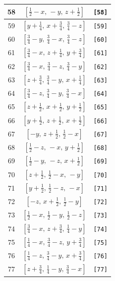 \documentclass[fleqn,8pt]{jsarticle}
\begin{document}
\begin{longtable}{ccc}
58 & $\left[ \frac{1}{2} - x,\, - y,\, z + \frac{1}{2} \right]$ & {\tt [58]} \\ \hline
59 & $\left[ y + \frac{1}{4},\, x + \frac{3}{4},\, \frac{3}{4} - z \right]$ & {\tt [59]} \\ \hline
60 & $\left[ \frac{3}{4} - y,\, \frac{3}{4} - x,\, \frac{3}{4} - z \right]$ & {\tt [60]} \\ \hline
61 & $\left[ \frac{3}{4} - x,\, z + \frac{1}{4},\, y + \frac{3}{4} \right]$ & {\tt [61]} \\ \hline
62 & $\left[ \frac{3}{4} - x,\, \frac{3}{4} - z,\, \frac{3}{4} - y \right]$ & {\tt [62]} \\ \hline
63 & $\left[ z + \frac{3}{4},\, \frac{3}{4} - y,\, x + \frac{1}{4} \right]$ & {\tt [63]} \\ \hline
64 & $\left[ \frac{3}{4} - z,\, \frac{3}{4} - y,\, \frac{3}{4} - x \right]$ & {\tt [64]} \\ \hline
65 & $\left[ z + \frac{1}{2},\, x + \frac{1}{2},\, y + \frac{1}{2} \right]$ & {\tt [65]} \\ \hline
66 & $\left[ y + \frac{1}{2},\, z + \frac{1}{2},\, x + \frac{1}{2} \right]$ & {\tt [66]} \\ \hline
67 & $\left[ - y,\, z + \frac{1}{2},\, \frac{1}{2} - x \right]$ & {\tt [67]} \\ \hline
68 & $\left[ \frac{1}{2} - z,\, - x,\, y + \frac{1}{2} \right]$ & {\tt [68]} \\ \hline
69 & $\left[ \frac{1}{2} - y,\, - z,\, x + \frac{1}{2} \right]$ & {\tt [69]} \\ \hline
70 & $\left[ z + \frac{1}{2},\, \frac{1}{2} - x,\, - y \right]$ & {\tt [70]} \\ \hline
71 & $\left[ y + \frac{1}{2},\, \frac{1}{2} - z,\, - x \right]$ & {\tt [71]} \\ \hline
72 & $\left[ - z,\, x + \frac{1}{2},\, \frac{1}{2} - y \right]$ & {\tt [72]} \\ \hline
73 & $\left[ \frac{1}{2} - x,\, \frac{1}{2} - y,\, \frac{1}{2} - z \right]$ & {\tt [73]} \\ \hline
74 & $\left[ \frac{3}{4} - x,\, z + \frac{3}{4},\, \frac{1}{4} - y \right]$ & {\tt [74]} \\ \hline
75 & $\left[ \frac{1}{4} - x,\, \frac{3}{4} - z,\, y + \frac{3}{4} \right]$ & {\tt [75]} \\ \hline
76 & $\left[ \frac{1}{4} - z,\, \frac{3}{4} - y,\, x + \frac{3}{4} \right]$ & {\tt [76]} \\ \hline
77 & $\left[ z + \frac{3}{4},\, \frac{1}{4} - y,\, \frac{3}{4} - x \right]$ & {\tt [77]} \\ \hline

\end{longtable}
\end{document}
